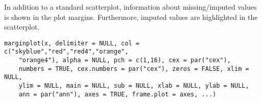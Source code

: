 %
\begin{Description}\relax
In addition to a standard scatterplot, information about missing/imputed
values is shown in the plot margins. Furthermore, imputed values are
highlighted in the scatterplot.
\end{Description}
%
\begin{Usage}
\begin{verbatim}
marginplot(x, delimiter = NULL, col = c("skyblue","red","red4","orange",
    "orange4"), alpha = NULL, pch = c(1,16), cex = par("cex"),
    numbers = TRUE, cex.numbers = par("cex"), zeros = FALSE, xlim = NULL,
    ylim = NULL, main = NULL, sub = NULL, xlab = NULL, ylab = NULL,
    ann = par("ann"), axes = TRUE, frame.plot = axes, ...)
\end{verbatim}
\end{Usage}
%
